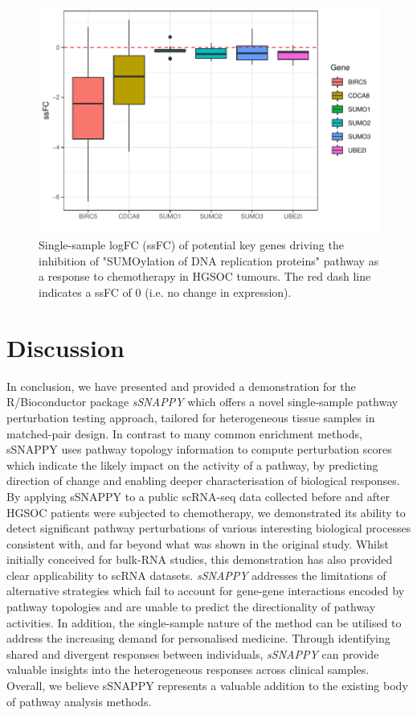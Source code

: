 \documentclass[9pt,a4paper,]{extarticle}
\begin{document}
\begin{figure}[h]

{\centering \includegraphics[width=0.8\linewidth]{sSNAPPY_paper_files/figure-latex/Figure8-1} 

}

\caption{Single-sample logFC (ssFC) of potential key genes driving the inhibition of "SUMOylation of DNA replication proteins" pathway as a response to chemotherapy in HGSOC tumours. The red dash line indicates a ssFC of 0 (i.e. no change in expression).}\label{fig:Figure8}
\end{figure}

\hypertarget{discussion}{%
\section{Discussion}\label{discussion}}

In conclusion, we have presented and provided a demonstration for the R/Bioconductor package \emph{sSNAPPY} which offers a novel single-sample pathway perturbation testing approach, tailored for heterogeneous tissue samples in matched-pair design.
In contrast to many common enrichment methods, sSNAPPY uses pathway topology information to compute perturbation scores which indicate the likely impact on the activity of a pathway, by predicting direction of change and enabling deeper characterisation of biological responses.
By applying sSNAPPY to a public scRNA-seq data collected before and after HGSOC patients were subjected to chemotherapy, we demonstrated its ability to detect significant pathway perturbations of various interesting biological processes consistent with, and far beyond what was shown in the original study.
Whilst initially conceived for bulk-RNA studies, this demonstration has also provided clear applicability to scRNA datasets.
\emph{sSNAPPY} addresses the limitations of alternative strategies which fail to account for gene-gene interactions encoded by pathway topologies and are unable to predict the directionality of pathway activities.
In addition, the single-sample nature of the method can be utilised to address the increasing demand for personalised medicine.
Through identifying shared and divergent responses between individuals, \emph{sSNAPPY} can provide valuable insights into the heterogeneous responses across clinical samples.
Overall, we believe sSNAPPY represents a valuable addition to the existing body of pathway analysis methods.
\end{document}
